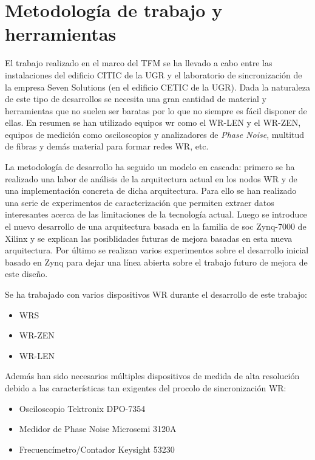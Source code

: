 \chapter{Metodología de trabajo y herramientas}

El trabajo realizado en el marco del TFM se ha llevado a cabo entre las 
instalaciones del edificio CITIC de la UGR y el laboratorio de sincronización 
de la empresa Seven Solutions (en el edificio CETIC de la UGR). Dada la 
naturaleza de este tipo de desarrollos se necesita una gran cantidad de 
material y herramientas que no suelen ser baratas por lo que no siempre es 
fácil disponer de ellas. En resumen se han utilizado equipos \gls{wr} como el 
WR-LEN y el WR-ZEN, equipos de medición como osciloscopios y analizadores de 
\textit{Phase Noise}, multitud de fibras y demás material para formar redes WR, 
etc.

La metodología de desarrollo ha seguido un modelo en cascada: primero se ha 
realizado una labor de análisis de la arquitectura actual en los nodos WR y de 
una implementación concreta de dicha arquitectura. Para ello se han realizado 
una serie de experimentos de caracterización que permiten extraer datos 
interesantes acerca de las limitaciones de la tecnología actual. Luego se 
introduce el nuevo desarrollo de una arquitectura basada en la familia de 
\gls{soc} Zynq-7000 de Xilinx y se explican las posiblidades futuras de mejora 
basadas en esta nueva arquitectura. Por último se realizan varios experimentos 
sobre el desarrollo inicial basado en Zynq para dejar una línea abierta sobre 
el trabajo futuro de mejora de este diseño.

Se ha trabajado con varios dispositivos WR durante el desarrollo de este 
trabajo:

\begin{itemize}
	\item WRS 
	\item WR-ZEN 
	\item WR-LEN 
\end{itemize}

Además han sido necesarios múltiples dispositivos de medida de alta resolución 
debido a las características tan exigentes del procolo de sincronización WR:

\begin{itemize}
	\item Osciloscopio Tektronix DPO-7354 
	\item Medidor de Phase Noise Microsemi 3120A 
	\item Frecuencímetro/Contador Keysight 53230 
\end{itemize}

